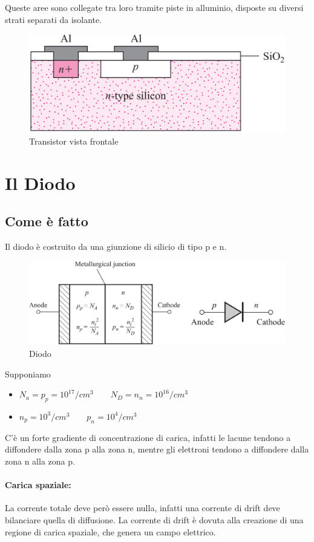Queste	aree	sono	collegate	tra	loro	tramite	piste	in	alluminio,	
disposte	su	diversi	strati	separati	da	isolante.

\begin{figure}[htbp]
    \centering
    \includegraphics[width=0.45\linewidth]{img/transistor_costruzione.png}
    \caption{ Transistor vista frontale}    
\end{figure}

\chapter{Il Diodo}
\section{Come è fatto}

Il diodo è costruito	da	una	giunzione	di	silicio	di	tipo	p	e	n.
\begin{figure}[htbp]
    \centering
    \includegraphics[width=0.65\linewidth]{img/diodo.png}
    \caption{Diodo}    
\end{figure}

Supponiamo 
\begin{itemize}
    \item $N_a = p_p= 10^{17}/cm^3\qquad N_D = n_n= 10^{16}/cm^3$
    \item $n_p = 10^{3}/cm^3\qquad p_n = 10^{4}/cm^3$
\end{itemize}

C’è	un	forte	gradiente	di	concentrazione	di	carica, infatti le	lacune	tendono	a	diffondere	dalla	zona	p alla zona n, mentre  gli	elettroni	tendono	a	diffondere	dalla	zona	n alla zona p.

\subsubsection{Carica	spaziale: } La	corrente	totale	deve	però	essere	nulla, infatti una corrente	di	drift deve	bilanciare	quella	di	diffusione. La corrente di drift è dovuta alla	creazione	di	una	regione	di	carica	spaziale,	
che	genera	un	campo	elettrico.



